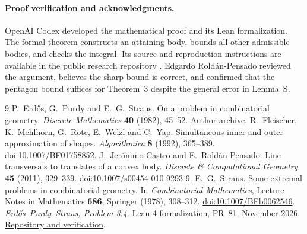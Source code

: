 \documentclass[11pt]{article}
\begin{document}
\paragraph{Proof verification and acknowledgments.}
OpenAI Codex developed the mathematical proof and its Lean
formalization. The formal theorem constructs an attaining body, bounds
all other admissible bodies, and checks the integral. Its source and
reproduction instructions are available in the public research
repository \cite{Lean}. Edgardo Rold\'an-Pensado reviewed the argument,
believes the sharp bound is correct, and confirmed that the pentagon
bound suffices for Theorem~3 despite the general error in Lemma~S.

\begin{thebibliography}{9}
P.~Erd\H{o}s, G.~Purdy and E.~G.~Straus.
On a problem in combinatorial geometry.
\emph{Discrete Mathematics} \textbf{40} (1982), 45--52.
\href{https://users.renyi.hu/~p_erdos/1982-09.pdf}{Author archive}.
R.~Fleischer, K.~Mehlhorn, G.~Rote, E.~Welzl and C.~Yap.
Simultaneous inner and outer approximation of shapes.
\emph{Algorithmica} \textbf{8} (1992), 365--389.
\href{https://doi.org/10.1007/BF01758852}{doi:10.1007/BF01758852}.
J.~Jer\'onimo-Castro and E.~Rold\'an-Pensado.
Line transversals to translates of a convex body.
\emph{Discrete \& Computational Geometry} \textbf{45} (2011), 329--339.
\href{https://doi.org/10.1007/s00454-010-9293-9}{doi:10.1007/s00454-010-9293-9}.
E.~G.~Straus. Some extremal problems in combinatorial geometry.
In \emph{Combinatorial Mathematics}, Lecture Notes in Mathematics
\textbf{686}, Springer (1978), 308--312.
\href{https://doi.org/10.1007/BFb0062546}{doi:10.1007/BFb0062546}.
\emph{Erd\H{o}s--Purdy--Straus, Problem 3.4}. Lean 4 formalization,
PR~81, November 2026.
\href{https://github.com/aliromman/math/pull/81}{Repository and verification}.
\end{thebibliography}
\end{document}
